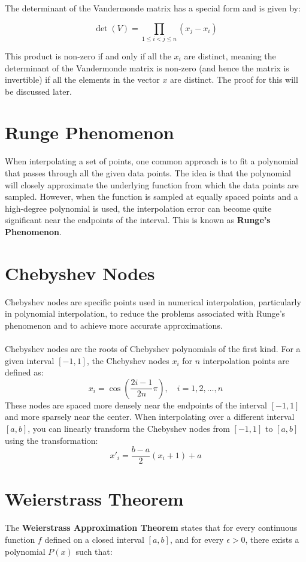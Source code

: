 \documentclass[12pt]{report} %
\begin{document}
The determinant of the Vandermonde matrix has a special form and is given by:

\begin{equation}
    \det(V) = \prod_{1 \leq i < j \leq n} (x_j - x_i)
\end{equation}

This product is non-zero if and only if all the \( x_i \) are distinct, meaning the determinant of the Vandermonde matrix is non-zero (and hence the matrix is invertible) if all the elements in the vector \( x \) are distinct. The proof for this will be discussed later.

\section{Runge Phenomenon}
When interpolating a set of points, one common approach is to fit a polynomial that passes through all the given data points. The idea is that the polynomial will closely approximate the underlying function from which the data points are sampled. However, when the function is sampled at equally spaced points and a high-degree polynomial is used, the interpolation error can become quite significant near the endpoints of the interval. This is known as \textbf{Runge's Phenomenon}.

\section{Chebyshev Nodes}
Chebyshev nodes are specific points used in numerical interpolation, particularly in polynomial interpolation, to reduce the problems associated with Runge's phenomenon and to achieve more accurate approximations.\\\\
Chebyshev nodes are the roots of Chebyshev polynomials of the first kind. For a given interval \([-1, 1]\), the Chebyshev nodes \(x_i\) for \(n\) interpolation points are defined as:
\begin{equation}
    x_i = \cos\left(\frac{2i - 1}{2n} \pi\right), \quad i = 1, 2, \dots, n
\end{equation}
These nodes are spaced more densely near the endpoints of the interval \([-1, 1]\) and more sparsely near the center. When interpolating over a different interval \([a, b]\), you can linearly transform the Chebyshev nodes from \([-1, 1]\) to \([a, b]\) using the transformation:
\[
x'_i = \frac{b-a}{2} \left( x_i + 1 \right) + a
\]

\section{Weierstrass Theorem}
The \textbf{Weierstrass Approximation Theorem} states that for every continuous function \(f\) defined on a closed interval \([a, b]\), and for every \(\epsilon > 0\), there exists a polynomial \(P(x)\) such that:
\end{document}
